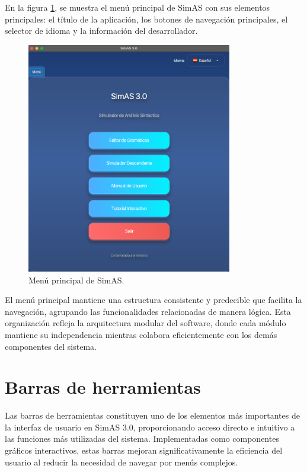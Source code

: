 En la figura \ref{fig:d1}, se muestra el menú principal de SimAS con sus elementos principales: el título de la aplicación, los botones de navegación principales, el selector de idioma y la información del desarrollador.

\needspace{8cm}
\begin{figure}[H]
\centering
\includegraphics[width=0.8\textwidth]{figuras2/menu.png}
\caption{Menú principal de SimAS.}
\label{fig:d1}
\end{figure}

El menú principal mantiene una estructura consistente y predecible que facilita la navegación, agrupando las funcionalidades relacionadas de manera lógica. Esta organización refleja la arquitectura modular del software, donde cada módulo mantiene su independencia mientras colabora eficientemente con los demás componentes del sistema. 

\section{Barras de herramientas}

Las barras de herramientas constituyen uno de los elementos más importantes de la interfaz de usuario en SimAS 3.0, proporcionando acceso directo e intuitivo a las funciones más utilizadas del sistema. Implementadas como componentes gráficos interactivos, estas barras mejoran significativamente la eficiencia del usuario al reducir la necesidad de navegar por menús complejos.

